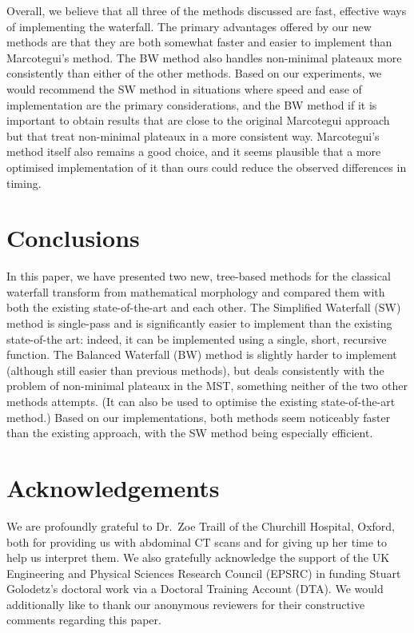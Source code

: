 \documentclass[preprint,a4paper]{elsarticle}
\begin{document}
Overall, we believe that all three of the methods discussed are fast, effective ways of implementing the waterfall. The primary advantages offered by our new methods are that they are both somewhat faster and easier to implement than Marcotegui's method. The BW method also handles non-minimal plateaux more consistently than either of the other methods. Based on our experiments, we would recommend the SW method in situations where speed and ease of implementation are the primary considerations, and the BW method if it is important to obtain results that are close to the original Marcotegui approach but that treat non-minimal plateaux in a more consistent way. Marcotegui's method itself also remains a good choice, and it seems plausible that a more optimised implementation of it than ours could reduce the observed differences in timing.

\section{Conclusions}
\label{sec:conclusions}

In this paper, we have presented two new, tree-based methods for the classical waterfall transform from mathematical morphology and compared them with both the existing state-of-the-art and each other. The Simplified Waterfall (SW) method is single-pass and is significantly easier to implement than the existing state-of-the art: indeed, it can be implemented using a single, short, recursive function. The Balanced Waterfall (BW) method is slightly harder to implement (although still easier than previous methods), but deals consistently with the problem of non-minimal plateaux in the MST, something neither of the two other methods attempts. (It can also be used to optimise the existing state-of-the-art method.) Based on our implementations, both methods seem noticeably faster than the existing approach, with the SW method being especially efficient.

\section{Acknowledgements}
\label{sec:acknowledgements}

We are profoundly grateful to Dr.\ Zoe Traill of the Churchill Hospital, Oxford, both for providing us with abdominal CT scans and for giving up her time to help us interpret them. We also gratefully acknowledge the support of the UK Engineering and Physical Sciences Research Council (EPSRC) in funding Stuart Golodetz's doctoral work via a Doctoral Training Account (DTA). We would additionally like to thank our anonymous reviewers for their constructive comments regarding this paper.



\end{document}
